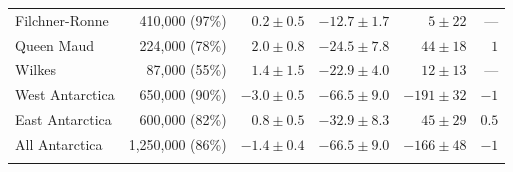 \begin{footnotesize}
\begin{longtable}{lrrrrr}
Filchner-Ronne  & 410,000   (97\%) & $0.2   \pm 0.5$ & $-12.7 \pm 1.7 $ & $5    \pm 22$ &  ---   \\
Queen Maud 	& 224,000   (78\%) & $2.0   \pm 0.8$ & $-24.5 \pm 7.8 $ & $44   \pm 18$ & $1   $ \\
Wilkes  	& 87,000    (55\%) & $1.4   \pm 1.5$ & $-22.9 \pm 4.0 $ & $12   \pm 13$ &  ---   \\
West Antarctica & 650,000   (90\%) & $-3.0  \pm 0.5$ & $-66.5 \pm 9.0 $ & $-191 \pm 32$ & $-1  $ \\
East Antarctica & 600,000   (82\%) & $0.8   \pm 0.5$ & $-32.9 \pm 8.3 $ & $45   \pm 29$ & $0.5 $ \\
All Antarctica  & 1,250,000 (86\%) & $-1.4  \pm 0.4$ & $-66.5 \pm 9.0 $ & $-166 \pm 48$ & $-1  $ \\[-.55cm]
%
\label{tab:estimates}
\end{longtable}
\end{footnotesize}


